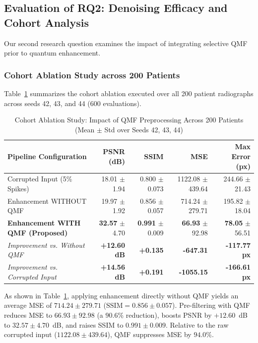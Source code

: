 \documentclass[12pt,onecolumn,draftclsnofoot]{IEEEtran}
\begin{document}
\subsection{Evaluation of RQ2: Denoising Efficacy and Cohort Analysis}
Our second research question examines the impact of integrating selective QMF prior to quantum enhancement.

\subsubsection{Cohort Ablation Study across 200 Patients}
Table~\ref{tab:ablation} summarizes the cohort ablation executed over all 200 patient radiographs across seeds 42, 43, and 44 ($600$ evaluations).

\begin{table}[t]
\centering
\caption{Cohort Ablation Study: Impact of QMF Preprocessing Across 200 Patients (Mean $\pm$ Std over Seeds 42, 43, 44)}
\label{tab:ablation}
\footnotesize
\begin{tabular}{@{}lrrrr@{}}
\toprule
\textbf{Pipeline Configuration} & \textbf{PSNR (dB)} & \textbf{SSIM} & \textbf{MSE} & \textbf{Max Error (px)} \\
\midrule
Corrupted Input (5\% Spikes) & 18.01 $\pm$ 1.94 & 0.800 $\pm$ 0.073 & 1122.08 $\pm$ 439.64 & 244.66 $\pm$ 21.43 \\
Enhancement WITHOUT QMF & 19.97 $\pm$ 1.92 & 0.856 $\pm$ 0.057 & 714.24 $\pm$ 279.71 & 195.82 $\pm$ 18.04 \\
\textbf{Enhancement WITH QMF (Proposed)} & \textbf{32.57} $\pm$ 4.70 & \textbf{0.991} $\pm$ 0.009 & \textbf{66.93} $\pm$ 92.98 & \textbf{78.05} $\pm$ 56.51 \\
\midrule
\textit{Improvement vs. Without QMF} & \textbf{+12.60 dB} & \textbf{+0.135} & \textbf{-647.31} & \textbf{-117.77 px} \\
\textit{Improvement vs. Corrupted Input} & \textbf{+14.56 dB} & \textbf{+0.191} & \textbf{-1055.15} & \textbf{-166.61 px} \\
\bottomrule
\end{tabular}
\end{table}

As shown in Table~\ref{tab:ablation}, applying enhancement directly without QMF yields an average MSE of $714.24 \pm 279.71$ ($\text{SSIM} = 0.856 \pm 0.057$). Pre-filtering with QMF reduces MSE to $66.93 \pm 92.98$ (a $90.6\%$ reduction), boosts PSNR by $+12.60$~dB to $32.57 \pm 4.70$~dB, and raises SSIM to $0.991 \pm 0.009$. Relative to the raw corrupted input ($1122.08 \pm 439.64$), QMF suppresses MSE by $94.0\%$.
\end{document}
